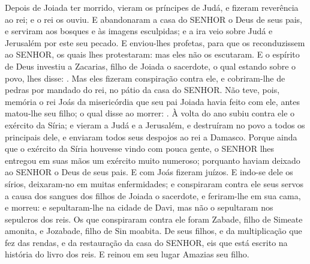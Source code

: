 {  Depois de Joiada ter morrido, vieram os príncipes de Judá, e fizeram reverência ao rei; e o rei os ouviu.
  E abandonaram a casa do SENHOR o Deus de seus pais, e serviram aos bosques e às imagens esculpidas; e a ira veio sobre Judá e Jerusalém por este seu pecado.
  E enviou-lhes profetas, para que os reconduzissem ao SENHOR, os quais lhes protestaram: mas eles não os escutaram.
  E o espírito de Deus investiu a Zacarias, filho de Joiada o sacerdote, o qual estando sobre o povo, lhes disse: .
  Mas eles fizeram conspiração contra ele, e cobriram-lhe de pedras por mandado do rei, no pátio da casa do SENHOR.
  Não teve, pois, memória o rei Joás da misericórdia que seu pai Joiada havia feito com ele, antes matou-lhe seu filho; o qual disse ao morrer: .
  À volta do ano subiu contra ele o exército da Síria; e vieram a Judá e a Jerusalém, e destruíram no povo a todos os principais dele, e enviaram todos seus despojos ao rei a Damasco.
  Porque ainda que o exército da Síria houvesse vindo com pouca gente, o SENHOR lhes entregou em suas mãos um exército muito numeroso; porquanto haviam deixado ao SENHOR o Deus de seus pais. E com Joás fizeram juízos.
  E indo-se dele os sírios, deixaram-no em muitas enfermidades; e conspiraram contra ele seus servos a causa dos sangues dos filhos de Joiada o sacerdote, e feriram-lhe em sua cama, e morreu: e sepultaram-lhe na cidade de Davi, mas não o sepultaram nos sepulcros dos reis.
  Os que conspiraram contra ele foram Zabade, filho de Simeate amonita, e Jozabade, filho de Sin moabita.
  De seus filhos, e da multiplicação que fez das rendas, e da restauração da casa do SENHOR, eis que está escrito na história do livro dos reis. E reinou em seu lugar Amazias seu filho.
\par }

